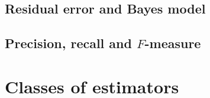 
\subsection{Residual error and Bayes model}


\subsection{Precision, recall and $F$-measure}



\section{Classes of estimators}
